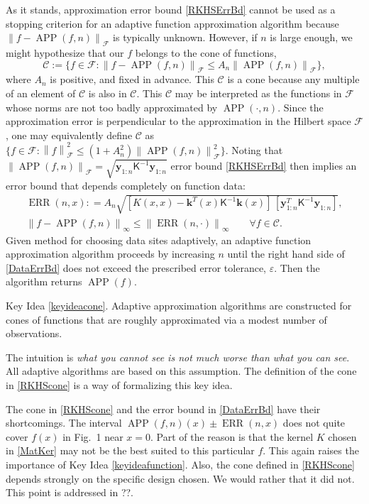 \documentclass[11pt]{NSFamsart}
\newcommand{\mK}{\mathsf{K}}
\DeclareMathOperator{\APP}{APP}
\DeclareMathOperator{\ERR}{ERR}
\newcommand{\bk}{{\boldsymbol{k}}}
\newcommand{\by}{{\boldsymbol{y}}}
\newcommand{\calc}{{\mathcal{C}}}
\newcommand{\calf}{{\mathcal{F}}}
\newcommand{\norm}[2][{}]{\ensuremath{\left \lVert #2 \right \rVert}_{#1}}
\newcommand{\keyideaconetext}{Adaptive approximation algorithms are constructed for cones of functions that are roughly approximated via a modest number of observations.}
\newcommand{\repeatkeyidea}[2]{\begin{itshape}Key Idea \ref{#1}. #2\end{itshape}}
\begin{document}
As it stands, approximation error bound \eqref{RKHSErrBd} cannot be used as a stopping criterion for an adaptive function approximation algorithm because $\norm[\calf]{f - \APP(f,n)}$ is typically unknown.  However, if $n$ is large enough, we might hypothesize that our $f$ belongs to the cone of functions,
\begin{equation} \label{RKHScone}
    \calc := \{f \in \calf : \norm[\calf]{f - \APP(f,n)} \le A_n \norm[\calf]{\APP(f,n)} \},
\end{equation}
where $A_n$ is positive, and fixed in advance.  This $\calc$ is a cone because any multiple of an element of $\calc$ is also in $\calc$.  This $\calc$ may be interpreted as the functions in $\calf$ whose norms are not too badly approximated by $\APP(\cdot,n)$.  Since the approximation error is perpendicular to the approximation in the Hilbert space $\calf$, one may equivalently define $\calc$ as  $\{f \in \calf : \norm[\calf]{f}^2 \le (1 + A_n^2) \norm[\calf]{\APP(f,n)}^2 \}$.  Noting that $\norm[\calf]{\APP(f,n)} = \sqrt{\by_{1:n} \mK^{-1} \by_{1:n}}$ error bound \eqref{RKHSErrBd} then implies an error bound that depends completely on function data: 
\begin{subequations} \label{DataErrBd}
\begin{gather}
    \label{DataErrBda} 
    \ERR(n,x) : = A_n \sqrt{[K(x,x) - \bk^T(x) \mK^{-1} \bk(x)] \, [\by_{1:n}^T \mK^{-1} \by_{1:n}] }, \\
    \norm[\infty]{f - \APP(f,n)} \le \norm[\infty]{\ERR(n,\cdot)} \qquad \forall f \in \calc.
\end{gather}
\end{subequations}
Given method for choosing data sites adaptively, an adaptive function approximation algorithm proceeds by increasing $n$ until the right hand side of \eqref{DataErrBd} does not exceed the prescribed error tolerance, $\varepsilon$.  Then the algorithm returns $\APP(f)$.

\repeatkeyidea{keyideacone}{\keyideaconetext}
The intuition is \emph{what you cannot see is not much worse than what you can see}. All adaptive algorithms are based on this assumption.  The definition of the cone in \eqref{RKHScone} is a way of formalizing this key idea.

The cone in  \eqref{RKHScone} and the error bound in \eqref{DataErrBd} have their shortcomings. The interval $\APP(f,n)(x) \pm \ERR(n,x)$ does not quite cover $f(x)$ in Fig.\ 1 near $x=0$.  Part of the reason is that the kernel $K$ chosen in \eqref{MatKer} may not be the best suited to this particular $f$.  This again raises the importance of Key Idea \ref{keyideafunction}. Also, the cone defined in  \eqref{RKHScone} depends strongly on the specific design chosen.  We would rather that it did not.  This point is addressed in ??.
\end{document}
